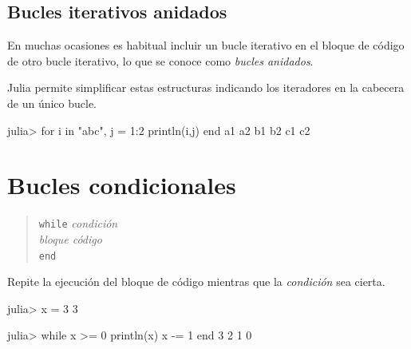 \documentclass[
  letterpaper,
  DIV=11,
  numbers=noendperiod]{scrreprt}
\newenvironment{Shaded}{\begin{snugshade}}{\end{snugshade}}
\newcommand{\ControlFlowTok}[1]{\textcolor[rgb]{0.00,0.23,0.31}{#1}}
\newcommand{\FloatTok}[1]{\textcolor[rgb]{0.68,0.00,0.00}{#1}}
\newcommand{\FunctionTok}[1]{\textcolor[rgb]{0.28,0.35,0.67}{#1}}
\newcommand{\KeywordTok}[1]{\textcolor[rgb]{0.00,0.23,0.31}{#1}}
\newcommand{\NormalTok}[1]{\textcolor[rgb]{0.00,0.23,0.31}{#1}}
\newcommand{\OperatorTok}[1]{\textcolor[rgb]{0.37,0.37,0.37}{#1}}
\newcommand{\StringTok}[1]{\textcolor[rgb]{0.13,0.47,0.30}{#1}}
\begin{document}
\hypertarget{bucles-iterativos-anidados}{%
\subsection{Bucles iterativos
anidados}\label{bucles-iterativos-anidados}}

En muchas ocasiones es habitual incluir un bucle iterativo en el bloque
de código de otro bucle iterativo, lo que se conoce como \emph{bucles
anidados}.

Julia permite simplificar estas estructuras indicando los iteradores en
la cabecera de un único bucle.

\begin{Shaded}
\begin{Highlighting}[]
\NormalTok{julia}\OperatorTok{\textgreater{}} \ControlFlowTok{for}\NormalTok{ i }\KeywordTok{in} \StringTok{"abc"}\NormalTok{, j }\OperatorTok{=} \FloatTok{1}\OperatorTok{:}\FloatTok{2}
         \FunctionTok{println}\NormalTok{(i,j)}
       \ControlFlowTok{end}
\NormalTok{a1}
\NormalTok{a2}
\NormalTok{b1}
\NormalTok{b2}
\NormalTok{c1}
\NormalTok{c2}
\end{Highlighting}
\end{Shaded}

\hypertarget{bucles-condicionales}{%
\section{Bucles condicionales}\label{bucles-condicionales}}

\begin{quote}
\texttt{while} \emph{condición}\\
\hspace*{0.333em}\hspace*{0.333em}\hspace*{0.333em}\emph{bloque
código}\\
\texttt{end}
\end{quote}

Repite la ejecución del bloque de código mientras que la
\emph{condición} sea cierta.

\begin{Shaded}
\begin{Highlighting}[]
\NormalTok{julia}\OperatorTok{\textgreater{}}\NormalTok{ x }\OperatorTok{=} \FloatTok{3}
\FloatTok{3}

\NormalTok{julia}\OperatorTok{\textgreater{}} \ControlFlowTok{while}\NormalTok{ x }\OperatorTok{\textgreater{}=} \FloatTok{0}
          \FunctionTok{println}\NormalTok{(x)}
\NormalTok{          x }\OperatorTok{{-}=} \FloatTok{1}
       \ControlFlowTok{end}
\FloatTok{3}
\FloatTok{2}
\FloatTok{1}
\FloatTok{0}
\end{Highlighting}
\end{Shaded}
\end{document}
